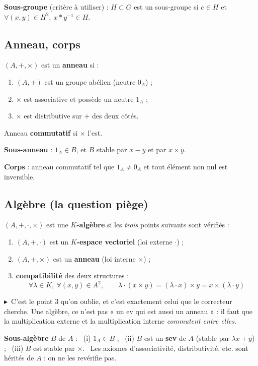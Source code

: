 \documentclass[10pt]{article}
\newcommand{\piege}{$\blacktriangleright$\ }
\begin{document}
\textbf{Sous-groupe} (critère à utiliser) : $H\subset G$ est un sous-groupe si
$e\in H$ et $\forall (x,y)\in H^2,\ x\ast y^{-1}\in H$.

\subsection{Anneau, corps}

$(A,+,\times)$ est un \textbf{anneau} si :
\begin{enumerate}
\item $(A,+)$ est un groupe abélien (neutre $0_A$) ;
\item $\times$ est associative et possède un neutre $1_A$ ;
\item $\times$ est distributive sur $+$ des deux côtés.
\end{enumerate}
Anneau \textbf{commutatif} si $\times$ l'est.

\textbf{Sous-anneau} : $1_A\in B$, et $B$ stable par $x-y$ et par $x\times y$.

\textbf{Corps} : anneau commutatif tel que $1_A\neq 0_A$ et tout élément non nul est inversible.

\subsection{Algèbre \textnormal{(la question piège)}}

$(A,+,\cdot,\times)$ est une \textbf{$K$-algèbre} si les \emph{trois} points suivants sont vérifiés :
\begin{enumerate}
\item $(A,+,\cdot)$ est un \textbf{$K$-espace vectoriel} \quad (loi externe $\cdot$) ;
\item $(A,+,\times)$ est un \textbf{anneau} \quad (loi interne $\times$) ;
\item \textbf{compatibilité} des deux structures :
\[\forall \lambda\in K,\ \forall (x,y)\in A^2,\qquad
\lambda\cdot(x\times y) = (\lambda\cdot x)\times y = x\times(\lambda\cdot y)\]
\end{enumerate}

\piege C'est le point 3 qu'on oublie, et c'est exactement celui que le correcteur cherche.
Une algèbre, ce n'est pas « un ev qui est aussi un anneau » : il faut que la multiplication
externe et la multiplication interne \emph{commutent entre elles}.

\textbf{Sous-algèbre} $B$ de $A$ : \ (i) $1_A\in B$ ; \ (ii) $B$ est un \textbf{sev} de $A$
(stable par $\lambda x+y$) ; \ (iii) $B$ est stable par $\times$.
\ Les axiomes d'associativité, distributivité, etc. sont hérités de $A$ : on ne les revérifie pas.
\end{document}
